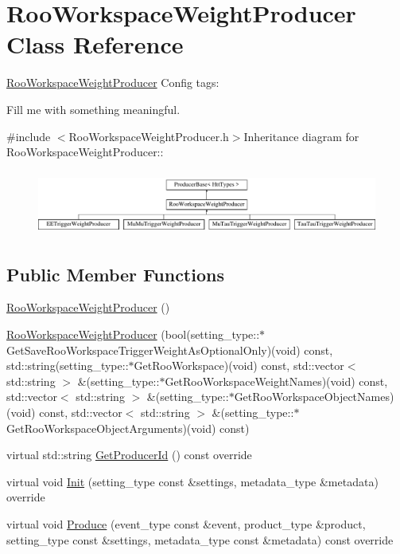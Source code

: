 \hypertarget{classRooWorkspaceWeightProducer}{
\section{RooWorkspaceWeightProducer Class Reference}
\label{classRooWorkspaceWeightProducer}
}


\hyperlink{classRooWorkspaceWeightProducer}{RooWorkspaceWeightProducer} Config tags:
\begin{DoxyItemize}
\item Fill me with something meaningful. 
\end{DoxyItemize} 


{\ttfamily \#include $<$RooWorkspaceWeightProducer.h$>$}Inheritance diagram for RooWorkspaceWeightProducer::\begin{figure}[H]
\begin{center}
\leavevmode
\includegraphics[height=2.14286cm]{classRooWorkspaceWeightProducer}
\end{center}
\end{figure}
\subsection*{Public Member Functions}
\begin{DoxyCompactItemize}
\item 
\hyperlink{classRooWorkspaceWeightProducer_a6a2e96c455f4035cf3c1ecfda323eb78}{RooWorkspaceWeightProducer} ()
\item 
\hyperlink{classRooWorkspaceWeightProducer_a86459d83cde20d84a09f7be5c184ba47}{RooWorkspaceWeightProducer} (bool(setting\_\-type::$\ast$GetSaveRooWorkspaceTriggerWeightAsOptionalOnly)(void) const, std::string(setting\_\-type::$\ast$GetRooWorkspace)(void) const, std::vector$<$ std::string $>$ \&(setting\_\-type::$\ast$GetRooWorkspaceWeightNames)(void) const, std::vector$<$ std::string $>$ \&(setting\_\-type::$\ast$GetRooWorkspaceObjectNames)(void) const, std::vector$<$ std::string $>$ \&(setting\_\-type::$\ast$GetRooWorkspaceObjectArguments)(void) const)
\item 
virtual std::string \hyperlink{classRooWorkspaceWeightProducer_a40f7cc577a5dbf0504fc9f3c1670a0a2}{GetProducerId} () const override
\item 
virtual void \hyperlink{classRooWorkspaceWeightProducer_a9fcf58750dfbf0cfbca6b4a61e57f2c6}{Init} (setting\_\-type const \&settings, metadata\_\-type \&metadata) override
\item 
virtual void \hyperlink{classRooWorkspaceWeightProducer_afd139b8380a91e8aaa72066a8a826350}{Produce} (event\_\-type const \&event, product\_\-type \&product, setting\_\-type const \&settings, metadata\_\-type const \&metadata) const override
\end{DoxyCompactItemize}
